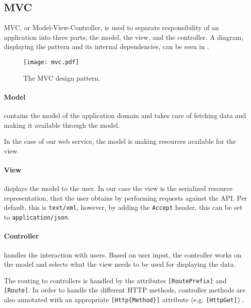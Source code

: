 \subsection{MVC} 
MVC, or Model-View-Controller\cite{aspmvc}, is used to separate responsibility of an application into three parts; the model, the view, and the controller.
A diagram, displaying the pattern and its internal dependencies, can be seen in .

\begin{figure}[h]
\begin{center}
\texttt{[image: mvc.pdf]}
\caption{The MVC design pattern.}
\label{mvcdiagram}
\end{center}
\end{figure}

\paragraph{Model} contains the model of the application domain and takes care of fetching data and making it available through the model.

In the case of our web service, the model is making resources available for the view.

\paragraph{View} displays the model to the user.
In our case the view is the serialized resource representation, that the user obtains by performing requests against the API.
Per default, this is \texttt{text/xml}, however, by adding the \texttt{Accept} header\cite[Section 14]{http_specification}, this can be set to \texttt{application/json}.

\paragraph{Controller} handles the interaction with users.
Based on user input, the controller works on the model and selects what the view needs to be used for displaying the data.

The routing to controllers is handled by the attributes \texttt{[RoutePrefix]} and \texttt{[Route]}.
In order to handle the different HTTP methods, controller methods are also annotated with an appropriate \texttt{[Http\{Method\}]} attribute (e.g. \texttt{[HttpGet]}) \cite{asp_routing}.